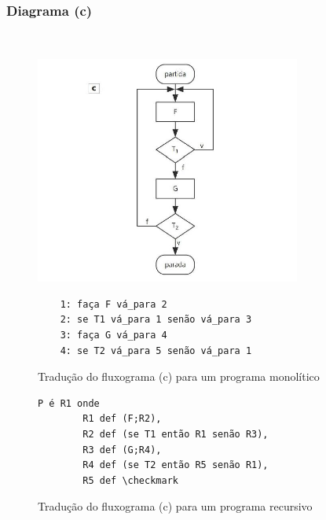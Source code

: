 \documentclass[12pt,fleqn]{article}
\begin{document}
\subsubsection{Diagrama (c)}
~
\begin{figure}[H]
    \centering
    \includegraphics[height=7.5cm]{img/diagrama_c}
\end{figure}
%
\begin{figure}[H]
\begin{verbatim}
    1: faça F vá_para 2
    2: se T1 vá_para 1 senão vá_para 3
    3: faça G vá_para 4
    4: se T2 vá_para 5 senão vá_para 1
\end{verbatim}
\caption{Tradução do fluxograma (c) para um programa monolítico}
\end{figure}
%
\begin{figure}[H]
\begin{Verbatim}[commandchars=\\\{\},codes={\catcode`\$=3\catcode`\^=7}]
    P é R1 onde
        R1 def (F;R2),
        R2 def (se T1 então R1 senão R3),
        R3 def (G;R4),
        R4 def (se T2 então R5 senão R1),
        R5 def \checkmark
\end{Verbatim}
\caption{Tradução do fluxograma (c) para um programa recursivo}
\end{figure}

\newpage
\end{document}
